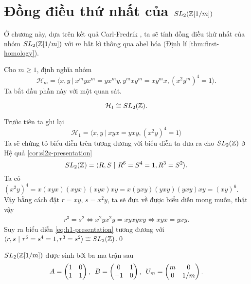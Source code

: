 \chapter{Đồng điều thứ nhất của $SL_2(\mathbb Z[1/m])$}

Ở chương này, dựa trên kết quả Carl-Fredrik \cite{CarlAbelSL2}, ta sẽ tính đồng điều thứ nhất của nhóm $SL_2(\mathbb Z[1/m])$ với $m$ bất kì thông qua abel hóa (Định lí \ref{thm:first-homology}).

Cho $m \geq 1$, định nghĩa nhóm
$$
    \mathcal{H}_m = \langle x,y\ |\ x^m y x^m = yx^my, y^mxy^m = xy^mx, (x^2y^m)^4 = 1 \rangle.
$$
Ta bắt đầu phần này với một quan sát.

\begin{proposition}
    $$
        \mathcal{H}_1 \cong SL_2(\mathbb Z).
    $$
\end{proposition}
\startproof Trước tiên ta ghi lại
\begin{equation}\label{eq:h1-presentation}
    \mathcal{H}_1 = \langle x,y\ |\ xyx = yxy, (x^2y)^4 = 1 \rangle
\end{equation}
Ta sẽ chứng tỏ biểu diễn trên tương đương với biểu diễn ta đưa ra cho $SL_2(\mathbb Z)$ ở Hệ quả \ref{cor:sl2z-presentation}
$$
    SL_2(\mathbb Z) = \langle R,S\ |\ R^6 = S^4 = 1, R^3 = S^2 \rangle.
$$
Ta có $(x^2y)^4 = x(xyx)(xyx)(xyx)xy = x(yxy)(yxy)(yxy)xy = (xy)^6$. Vậy bằng cách đặt $r = xy$, $s = x^2y$, ta sẽ đưa về được biểu diễn mong muốn, thật vậy
\begin{align*}
    r^3 = s^2 \Longleftrightarrow x^2yx^2y = xyxyxy \Longleftrightarrow xyx = yxy.
\end{align*}
Suy ra biểu diễn \ref{eq:h1-presentation} tương đương với $\langle r,s\ |\ r^6 = s^4 = 1, r^3 = s^2 \rangle \cong SL_2(\mathbb Z)$.\qed

\begin{lemma}\label{lem:gen-sl2-1m}
    $SL_2(\mathbb Z[1/m])$ được sinh bởi ba ma trận sau
    $$
        A = \begin{pmatrix}
            1 & 0 \\
            1 & 1
        \end{pmatrix},\enskip
        B = \begin{pmatrix}
            0  & 1 \\
            -1 & 0
        \end{pmatrix},\enskip
        U_m = \begin{pmatrix}
            m & 0   \\
            0 & 1/m
        \end{pmatrix}.
    $$
\end{lemma}

